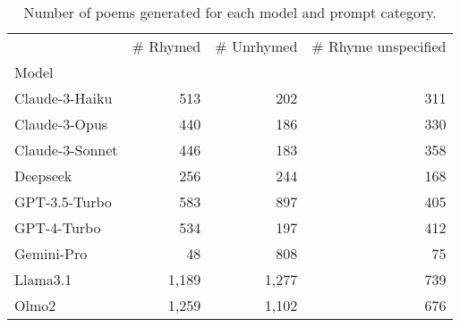 \begin{table}[H]
  \centering
  \small
  \singlespacing
  \begin{tabular}{lrrr}
  \toprule
   & \# Rhymed & \# Unrhymed & \# Rhyme unspecified \\
  Model &  &  &  \\
  \midrule
  Claude-3-Haiku & 513 & 202 & 311 \\
  Claude-3-Opus & 440 & 186 & 330 \\
  Claude-3-Sonnet & 446 & 183 & 358 \\
  Deepseek & 256 & 244 & 168 \\
  GPT-3.5-Turbo & 583 & 897 & 405 \\
  GPT-4-Turbo & 534 & 197 & 412 \\
  Gemini-Pro & 48 & 808 & 75 \\
  Llama3.1 & 1,189 & 1,277 & 739 \\
  Olmo2 & 1,259 & 1,102 & 676 \\
  \bottomrule
  \end{tabular}
  \caption{Number of poems generated for each model and prompt category.}
  \label{tab:num_poems_models}
\end{table}